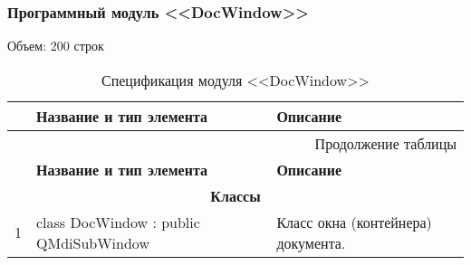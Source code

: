\subsubsection*{Программный модуль <<DocWindow>>}
Объем: 200 строк

\small
\singlespacing
\begin{longtable}[h]{|p{}|p{}|p{}|}
  \caption{Спецификация модуля <<DocWindow>>}
	\\ \hline
	  \textbf{\No}                  &
	  \textbf{Название и тип элемента}  &
	  \textbf{Описание}
	\\ \hline
  \endfirsthead

  \multicolumn{3}{r}{Продолжение таблицы \thetable{}}
  \\ \hline
	  \textbf{\No}                  &
	  \textbf{Название и тип элемента}  &
	  \textbf{Описание}
	\\ \hline
  \endhead


  \multicolumn{3}{|c|}{\textbf{Классы}} \\
  \hline
  1 & class DocWindow : public QMdiSubWindow & Класс окна (контейнера) документа. \\ \hline
\end{longtable}
\normalsize
\onehalfspacing


